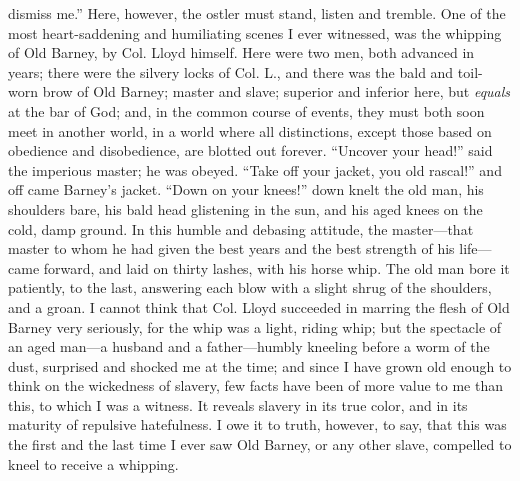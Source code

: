 dismiss me.'' Here, however, the ostler must stand, listen and tremble.
One of the most heart-saddening and humiliating scenes I ever witnessed,
was the whipping of Old Barney, by Col. Lloyd himself. Here were two
men, both advanced in years; there were the silvery locks of Col. L.,
and there was the bald and toil-worn brow of Old Barney; {}master and
slave; superior and inferior here, but \emph{equals} at the bar of God;
and, in the common course of events, they must both soon meet in another
world, in a world where all distinctions, except those based on
obedience and disobedience, are blotted out forever. ``Uncover your
head!'' said the imperious master; he was obeyed. ``Take off your
jacket, you old rascal!'' and off came Barney's jacket. ``Down on your
knees!'' down knelt the old man, his shoulders bare, his bald head
glistening in the sun, and his aged knees on the cold, damp ground. In
this humble and debasing attitude, the master---that master to whom he
had given the best years and the best strength of his life---came
forward, and laid on thirty lashes, with his horse whip. The old man
bore it patiently, to the last, answering each blow with a slight shrug
of the shoulders, and a groan. I cannot think that Col. Lloyd succeeded
in marring the flesh of Old Barney very seriously, for the whip was a
light, riding whip; but the spectacle of an aged man---a husband and a
father---humbly kneeling before a worm of the dust, surprised and
shocked me at the time; and since I have grown old enough to think on
the wickedness of slavery, few facts have been of more value to me than
this, to which I was a witness. It reveals slavery in its true color,
and in its maturity of repulsive hatefulness. I owe it to truth,
however, to say, that this was the first and the last time I ever saw
Old Barney, or any other slave, compelled to kneel to receive a
whipping.

